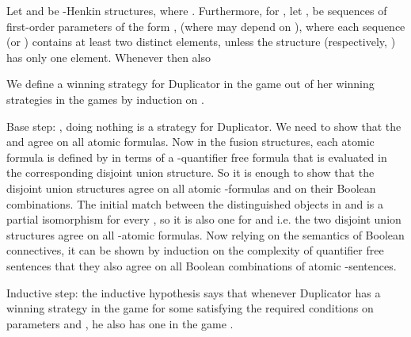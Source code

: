 \documentclass{LMCS}
\newcommand{\fotc}{\textsf{FO(TC)}\xspace}
\begin{document}
\begin{thm}[Fusion Theorem for \fotc]
Let  and  be -Henkin
structures, where . Furthermore, for , 
let ,  be sequences of first-order
parameters of the form ,
 (where
 may depend on ), where each sequence 
(or  ) contains at least two
distinct elements, unless the structure 
(respectively, ) has
only one element. Whenever 
then also  
\end{thm}


\proof
We define a winning strategy for Duplicator in the game
 out of her winning
strategies in the games
 by induction
on .

Base step: , doing nothing is a strategy for Duplicator. We
need to show that the  and  agree on all
atomic formulas. Now in the fusion structures, each atomic formula is
defined by  in terms of a -quantifier free formula
that is evaluated in the corresponding disjoint union structure. So it
is enough to show that the disjoint union structures agree on all
atomic -formulas and on their Boolean combinations. The
initial match between the distinguished objects in  and  is a partial isomorphism for
every , so it is also one for  and
 i.e. the two disjoint union structures
agree on all -atomic formulas. Now relying on the
semantics of Boolean connectives, it can be shown by induction on
the complexity of quantifier free sentences that they also agree
on all Boolean combinations of atomic -sentences.

Inductive step: the inductive hypothesis says that whenever Duplicator
has a winning strategy in the game 
for some  satisfying the required
conditions on parameters and , he also has one in
the game .
\end{document}
